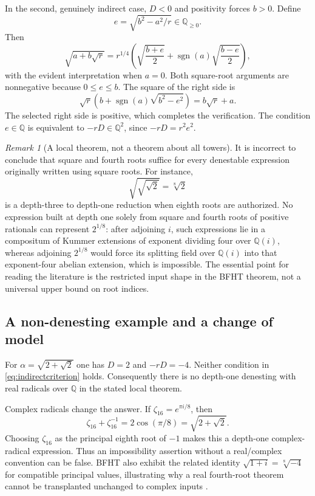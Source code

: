 \documentclass[11pt,oneside]{article}
\numberwithin{equation}{section}
\theoremstyle{definition}
\theoremstyle{remark}
\newtheorem{remark}[theorem]{Remark}
\newcommand{\Q}{\mathbb{Q}}
\newcommand{\sgn}{\operatorname{sgn}}
\begin{document}
In the second, genuinely indirect case, $D<0$ and positivity forces $b>0$. Define
\[
e=\sqrt{b^2-a^2/r}\in\Q_{\ge0}.
\]
Then
\begin{equation}\label{eq:indirect}
\sqrt{a+b\sqrt r}=r^{1/4}
\left(\sqrt{\frac{b+e}{2}}+
\sgn(a)\sqrt{\frac{b-e}{2}}\right),
\end{equation}
with the evident interpretation when $a=0$. Both square-root arguments are nonnegative because $0\le e\le b$. The square of the right side is
\[
\sqrt r\left(b+\sgn(a)\sqrt{b^2-e^2}\right)
=b\sqrt r+a.
\]
The selected right side is positive, which completes the verification. The condition $e\in\Q$ is equivalent to $-rD\in\Q^2$, since $-rD=r^2e^2$.

\begin{remark}[A local theorem, not a theorem about all towers]
It is incorrect to conclude that square and fourth roots suffice for every denestable expression originally written using square roots. For instance,
\[
\sqrt{\sqrt{\sqrt2}}=\sqrt[8]2
\]
is a depth-three to depth-one reduction when eighth roots are authorized. No expression built at depth one solely from square and fourth roots of positive rationals can represent $2^{1/8}$: after adjoining $i$, such expressions lie in a compositum of Kummer extensions of exponent dividing four over $\Q(i)$, whereas adjoining $2^{1/8}$ would force its splitting field over $\Q(i)$ into that exponent-four abelian extension, which is impossible. The essential point for reading the literature is the restricted input shape in the BFHT theorem, not a universal upper bound on root indices.
\end{remark}

\subsection{A non-denesting example and a change of model}
For $\alpha=\sqrt{2+\sqrt2}$ one has $D=2$ and $-rD=-4$. Neither condition in \eqref{eq:indirectcriterion} holds. Consequently there is no depth-one denesting with real radicals over $\Q$ in the stated local theorem.

Complex radicals change the answer. If $\zeta_{16}=e^{\pi i/8}$, then
\[
\zeta_{16}+\zeta_{16}^{-1}
=2\cos(\pi/8)=\sqrt{2+\sqrt2}.
\]
Choosing $\zeta_{16}$ as the principal eighth root of $-1$ makes this a depth-one complex-radical expression. Thus an impossibility assertion without a real/complex convention can be false. BFHT also exhibit the related identity $\sqrt{1+i}=\sqrt[8]{-4}$ for compatible principal values, illustrating why a real fourth-root theorem cannot be transplanted unchanged to complex inputs \cite{bfht}.
\end{document}
